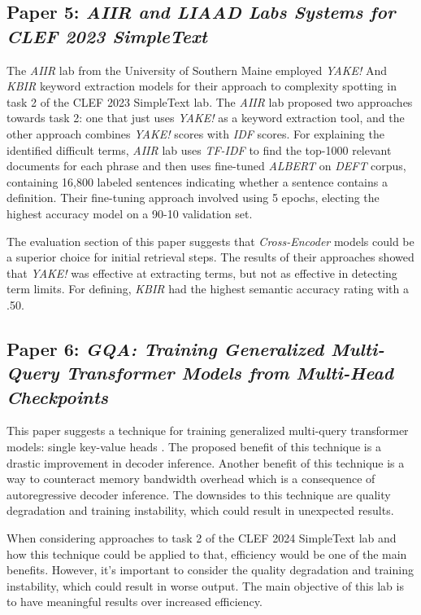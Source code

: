 \documentclass[runningheads]{llncs}
\begin{document}
\subsection{Paper 5: \textit{AIIR and LIAAD Labs Systems for CLEF 2023 SimpleText}}
The \textit{AIIR} lab from the University of Southern Maine employed \textit{YAKE!} And \textit{KBIR} keyword extraction models for their approach to complexity spotting in task 2 of the CLEF 2023 SimpleText lab. The \textit{AIIR} lab proposed two approaches towards task 2: one that just uses \textit{YAKE!} as a keyword extraction tool, and the other approach combines \textit{YAKE!} scores with \textit{IDF} scores. For explaining the identified difficult terms, \textit{AIIR} lab uses \textit{TF-IDF} to find the top-1000 relevant documents for each phrase and then uses fine-tuned \textit{ALBERT} on \textit{DEFT} corpus, containing 16,800 labeled sentences indicating whether a sentence contains a definition. Their fine-tuning approach involved using 5 epochs, electing the highest accuracy model on a 90-10 validation set. 

The evaluation section of this paper suggests that \textit{Cross-Encoder} models could be a superior choice for initial retrieval steps. The results of their approaches showed that \textit{YAKE!} was effective at extracting terms, but not as effective in detecting term limits. For defining, \textit{KBIR} had the highest semantic accuracy rating with a .50. 

\subsection{Paper 6: \textit{GQA: Training Generalized Multi-Query Transformer Models from Multi-Head Checkpoints}}
This paper suggests a technique for training generalized multi-query transformer models: single key-value heads \cite{Paper 6}. The proposed benefit of this technique is a drastic improvement in decoder inference. Another benefit of this technique is a way to counteract memory bandwidth overhead which is a consequence of autoregressive decoder inference. The downsides to this technique are quality degradation and training instability, which could result in unexpected results. 

When considering approaches to task 2 of the CLEF 2024 SimpleText lab and how this technique could be applied to that, efficiency would be one of the main benefits. However, it’s important to consider the quality degradation and training instability, which could result in worse output. The main objective of this lab is to have meaningful results over increased efficiency. 
\end{document}
